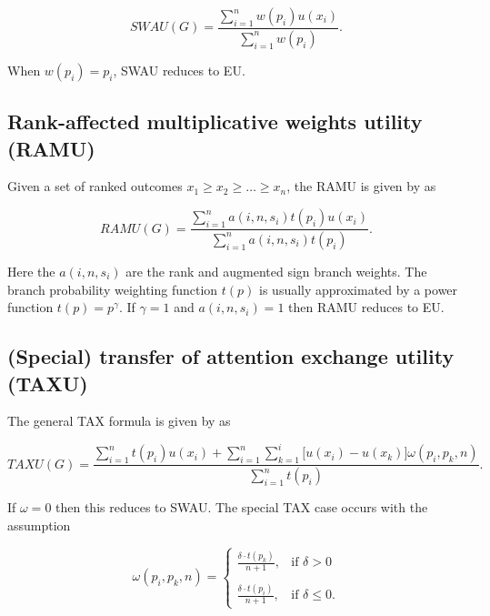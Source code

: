 \documentclass{article}\usepackage[]{graphicx}\usepackage[]{color}
\begin{document}
\begin{equation}
SWAU(G) = \frac{\displaystyle \sum\limits_{i=1}^{n} w(p_i) u(x_i)}{\displaystyle \sum\limits_{i=1}^{n} w(p_i)}.
\label{swau_equation}
\end{equation}

When $w(p_i) = p_i$, SWAU reduces to EU.

\subsection{Rank-affected multiplicative weights utility (RAMU)}

Given a set of ranked outcomes $x_1 \geq x_2 \geq \ldots \geq x_n$, the RAMU is given by \cite{Birnbaum_2008} as

\begin{equation}
RAMU(G) = \frac{\displaystyle \sum\limits_{i=1}^{n} a(i, n, s_i) t(p_i) u(x_i)}{\displaystyle \sum\limits_{i=1}^{n} a(i, n, s_i) t(p_i)}.
\label{ramu_equation}
\end{equation}

Here the $a(i, n, s_i)$ are the rank and augmented sign branch weights.
The branch probability weighting function $t(p)$ is usually approximated by a power function $t(p) = p^\gamma$. If $\gamma = 1$ and $a(i, n, s_i) = 1$ then RAMU reduces to EU.

\subsection{(Special) transfer of attention exchange utility (TAXU)}

The general TAX formula is given by \cite{Birnbaum_2008} as

\begin{equation}
TAXU(G) = \frac{\displaystyle \sum\limits_{i=1}^{n} t(p_i) u(x_i) + \sum\limits_{i=1}^{n} \sum\limits_{k=1}^{i} \Bigg[ u(x_i) - u(x_k) \Bigg] \omega(p_i, p_k, n) }{\displaystyle \sum\limits_{i=1}^{n} t(p_i)}.
\label{taxu_equation}
\end{equation}

If $\omega = 0$ then this reduces to SWAU.
The special TAX case occurs with the assumption

\begin{equation}
\omega(p_i, p_k, n) =
\begin{cases}
\frac{\displaystyle \delta \cdot t(p_k)}{\displaystyle n+1}, &\text{if $\delta > 0$}\\ \\
\frac{\displaystyle \delta \cdot t(p_i)}{\displaystyle n+1}, &\text{if $\delta \leq 0$}.
\end{cases}
\label{staxu_assumption}
\end{equation}
\end{document}
